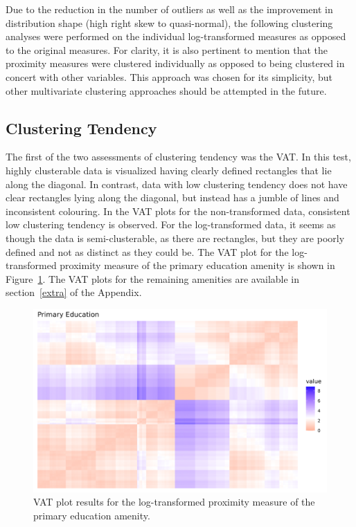 \documentclass[11pt, a4paper]{article}
\begin{document}
\par
Due to the reduction in the number of outliers as well as the improvement in distribution shape (high right skew to quasi-normal), the following clustering analyses were performed on the individual log-transformed measures as opposed to the original measures. For clarity, it is also pertinent to mention that the proximity measures were clustered individually as opposed to being clustered in concert with other variables. This approach was chosen for its simplicity, but other multivariate clustering approaches should be attempted in the future.










\subsection{Clustering Tendency}


The first of the two assessments of clustering tendency was the VAT. In this test, highly clusterable data is visualized having clearly defined rectangles that lie along the diagonal. In contrast, data with low clustering tendency does not have clear rectangles lying along the diagonal, but instead has a jumble of lines and inconsistent colouring. In the VAT plots for the non-transformed data, consistent low clustering tendency is observed. For the log-transformed data, it seems as though the data is semi-clusterable, as there are rectangles, but they are poorly defined and not as distinct as they could be. The VAT plot for the log-transformed proximity measure of the primary education amenity is shown in Figure~\ref{prieducvat}. The VAT plots for the remaining amenities are available in section~\ref{extra} of the Appendix.




\begin{figure}[H]
\centering
\includegraphics[width=\textwidth]{./vat/primaryeducation_vat_log.png}
\caption[Primary education VAT plot]{VAT plot results for the log-transformed proximity measure of the primary education amenity.}\label{prieducvat}
\end{figure}
\end{document}
